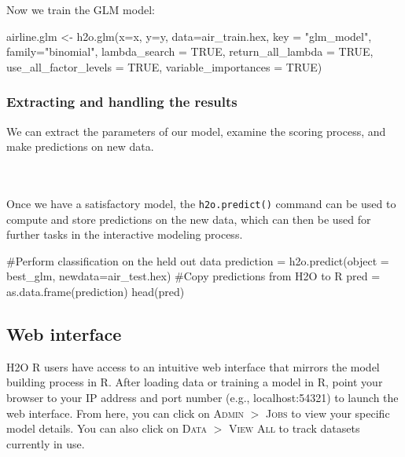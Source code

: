\documentclass[11pt]{article}
\begin{document}
Now we train the GLM model:

\begin{spverbatim}
airline.glm <- h2o.glm(x=x,
                       y=y,
                       data=air_train.hex,
                       key = "glm_model",
                       family="binomial",
                       lambda_search = TRUE,
                       return_all_lambda = TRUE,
                       use_all_factor_levels = TRUE,
                       variable_importances = TRUE)
\end{spverbatim}

\subsubsection{Extracting and handling the results} \label{3.2.1}

We can extract the parameters of our model, examine the scoring process, and make predictions on new data.

\noindent
\\
\\
Once we have a satisfactory model, the \texttt{h2o.predict()} command can be used to compute and store predictions on the new data, which can then be used for further tasks in the interactive modeling process.
\begin{spverbatim}
#Perform classification on the held out data
prediction = h2o.predict(object = best_glm, newdata=air_test.hex)
#Copy predictions from H2O to R
pred = as.data.frame(prediction)
head(pred)
\end{spverbatim}
\subsection{Web interface} \label{3.3}
H2O R users have access to an intuitive web interface that mirrors the model building process in R. After loading data or training a model in R, point your browser to your IP address and port number (e.g., localhost:54321) to launch the web interface. From here, you can click on \textsc{Admin} $>$ \textsc{Jobs} to view your specific model details. You can also click on \textsc{Data} $>$ \textsc{View All} to track datasets currently in use. 
\end{document}
